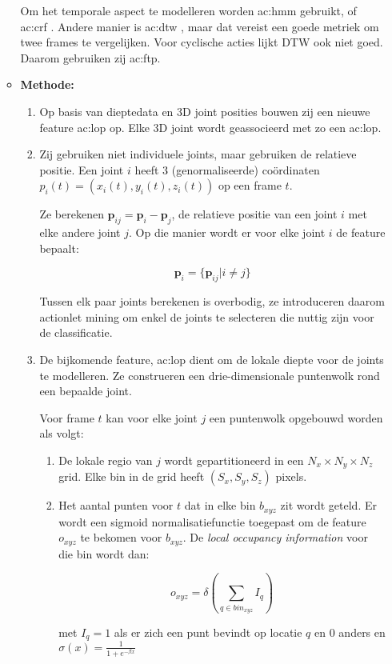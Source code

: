 \begin{itemize}
\begin{itemize}
		Om het temporale aspect te modelleren worden \gls{ac:hmm} \cite{Lv2006} gebruikt, of \gls{ac:crf} \cite{Han2010}. Andere manier is \gls{ac:dtw} \cite{Muller2006}, maar dat vereist een goede metriek om twee frames te vergelijken. Voor cyclische acties lijkt DTW ook niet goed. Daarom gebruiken zij \gls{ac:ftp}.
		\item \textbf{Methode:}
		\begin{enumerate}
			\item Op basis van dieptedata en 3D joint posities bouwen zij een nieuwe feature \gls{ac:lop} op. Elke 3D joint wordt geassocieerd met zo een \gls{ac:lop}.
			\item Zij gebruiken niet individuele joints, maar gebruiken de relatieve positie. Een joint $i$ heeft 3 (genormaliseerde) coördinaten $p_i(t) = (x_i(t), y_i(t), z_i(t))$ op een frame $t$.
			
			Ze berekenen $\textbf{p}_{ij} = \textbf{p}_i - \textbf{p}_j$, de relatieve positie van een joint $i$ met elke andere joint $j$. Op die manier wordt er voor elke joint $i$ de feature bepaalt:
			
			$$\textbf{p}_i = \{\textbf{p}_{ij} | i \neq j \}$$
			
			Tussen elk paar joints berekenen is overbodig, ze introduceren daarom actionlet mining om enkel de joints te selecteren die nuttig zijn voor de classificatie.
 			
 			\item De bijkomende feature, \gls{ac:lop} dient om de lokale diepte voor de joints te modelleren. Ze construeren een drie-dimensionale puntenwolk rond een bepaalde joint.
 			
 			Voor frame $t$ kan voor elke joint $j$ een puntenwolk opgebouwd worden als volgt:
 			
 			\begin{enumerate}
 				\item De lokale regio van $j$ wordt gepartitioneerd in een $N_x \times N_y \times N_z$ grid. Elke bin in de grid heeft  $(S_x, S_y, S_z)$ pixels.
 				\item Het aantal punten voor $t$ dat in elke bin $b_{xyz}$ zit wordt geteld. Er wordt een sigmoid normalisatiefunctie toegepast om de feature $o_{xyz}$ te bekomen voor $b_{xyz}$. De \textit{local occupancy information} voor die bin wordt dan:
 				
 				$$o_{xyz} = \delta(\sum_{q \in bin_{xyz}} I_q)$$
 				
 				met $I_q = 1$ als er zich een punt bevindt op locatie $q$ en 0 anders en $\sigma(x) = \frac{1}{1 + e^{-\beta x}}$ 
 					

\end{enumerate}
\end{enumerate}
\end{itemize}
\end{itemize}
